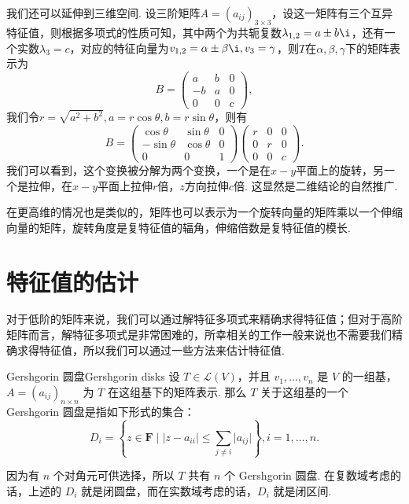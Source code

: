 我们还可以延伸到三维空间. 设三阶矩阵$A=(a_{ij})_{3\times 3}$，设这一矩阵有三个互异特征值，则根据多项式的性质可知，其中两个为共轭复数$\lambda_{1,2}=a\pm b\i$，还有一个实数$\lambda_3=c$，对应的特征向量为$v_{1,2}=\alpha\pm \beta\i,v_3=\gamma$，则$T$在$\alpha,\beta,\gamma$下的矩阵表示为
\[ B=\begin{pmatrix}
        a & b & 0 \\ -b & a & 0 \\ 0 & 0 & c
    \end{pmatrix}, \]
我们令$r=\sqrt{a^2+b^2},a=r\cos\theta,b=r\sin\theta$，则有
\[ B=\begin{pmatrix}
        \cos\theta & \sin\theta & 0 \\ -\sin\theta & \cos\theta & 0 \\ 0 & 0 & 1
    \end{pmatrix}\begin{pmatrix}
        r & 0 & 0 \\ 0 & r & 0 \\ 0 & 0 & c
    \end{pmatrix}. \]
我们可以看到，这个变换被分解为两个变换，一个是在$x-y$平面上的旋转，另一个是拉伸，在$x-y$平面上拉伸$r$倍，$z$方向拉伸$c$倍. 这显然是二维结论的自然推广.

在更高维的情况也是类似的，矩阵也可以表示为一个旋转向量的矩阵乘以一个伸缩向量的矩阵，旋转角度是复特征值的辐角，伸缩倍数是复特征值的模长.

\section{特征值的估计}

对于低阶的矩阵来说，我们可以通过解特征多项式来精确求得特征值；但对于高阶矩阵而言，解特征多项式是非常困难的，所幸相关的工作一般来说也不需要我们精确求得特征值，所以我们可以通过一些方法来估计特征值.

\begin{definition}{Gershgorin 圆盘}{Gershgorin disks}
    设 $T \in \mathcal{L}(V)$，并且 $v_1, \ldots, v_n$ 是 $V$ 的一组基，$A = (a_{ij})_{n \times n}$ 为 $T$ 在这组基下的矩阵表示. 那么 $T$ 关于这组基的一个 Gershgorin 圆盘是指如下形式的集合：
    \[ D_i = \left\{z \in \mathbf{F} \mid \lvert z - a_{ii} \rvert \leqslant \sum_{j \neq i} \lvert a_{ij} \rvert\right\}, i = 1, \ldots, n. \]
\end{definition}

因为有 $n$ 个对角元可供选择，所以 $T$ 共有 $n$ 个 Gershgorin 圆盘. 在复数域考虑的话，上述的 $D_i$ 就是闭圆盘，而在实数域考虑的话，$D_i$ 就是闭区间.

